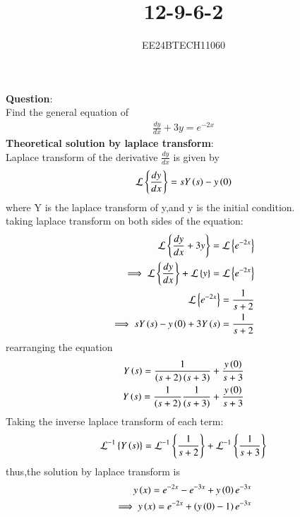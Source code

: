 \documentclass[journal]{IEEEtran}
\begin{document}

\vspace{3cm}

\title{12-9-6-2}
\author{EE24BTECH11060}
{\let\newpage\relax\maketitle}

\renewcommand{\thefigure}{\theenumi}
\renewcommand{\thetable}{\theenumi}
\setlength{\intextsep}{10pt} %


\renewcommand{\thetable}{\theenumi}

\textbf{Question}:\\
Find the general equation of 
\begin{align}
    \frac{dy}{dx}+3y=e^{-2x}
\end{align}
\textbf{Theoretical solution by laplace transform}:\\
Laplace transform of the derivative $\frac{dy}{dx}$ is given by 
\begin{align}
    \mathcal{L}\left\{\frac{dy}{dx}\right\}=sY\left(s\right)-y\left(0\right)
\end{align}
where Y is the laplace transform of y,and y is the initial condition.\\
taking laplace transform on both sides of the equation:
\begin{align}
    \mathcal{L}\left\{\frac{dy}{dx}+3y\right\}=\mathcal{L}\left\{e^{-2x}\right\}\\
    \implies \mathcal{L}\left\{\frac{dy}{dx}\right\}+\mathcal{L}\left\{y\right\}=\mathcal{L}\left\{e^{-2x}\right\}\\
    \mathcal{L}\left\{e^{-2x}\right\}=\frac{1}{s+2}\\
    \implies sY\left(s\right)-y\left(0\right)+3Y\left(s\right)=\frac{1}{s+2}
\end{align}
rearranging the equation 
\begin{align}
    Y\left(s\right)=\frac{1}{\left(s+2\right)\left(s+3\right)}+\frac{y\left(0\right)}{s+3}\\
     Y\left(s\right)=\frac{1}{\left(s+2\right)}\frac{1}{\left(s+3\right)}+\frac{y\left(0\right)}{s+3}
\end{align}
Taking the inverse laplace transform of each term:
\begin{align}
    \mathcal{L}^{-1}\left\{Y\left(s\right)\right\}=\mathcal{L}^{-1}\left\{\frac{1}{s+2}\right\}+\mathcal{L}^{-1}\left\{\frac{1}{s+3}\right\}
\end{align}
thus,the solution by laplace transform is 
\begin{align}
    y\left(x\right)=e^{-2x}-e^{-3x}+y\left(0\right)e^{-3x}\\
    \implies  y\left(x\right)=e^{-2x}+\left(y\left(0\right)-1\right)e^{-3x}
\end{align}
\end{document}
